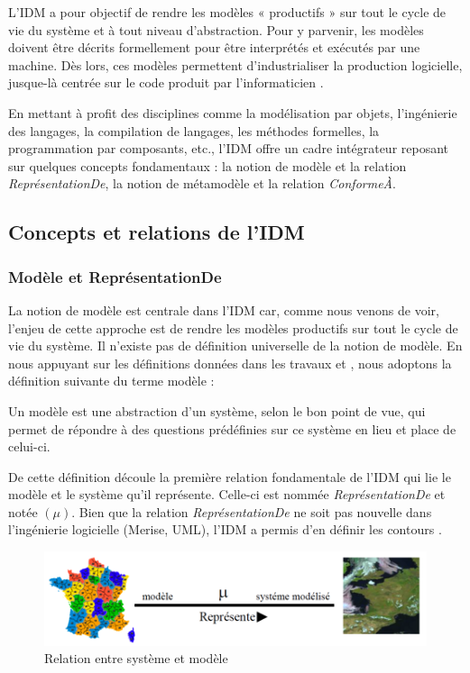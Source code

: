 L'IDM a pour objectif de rendre les modèles « productifs » sur tout le cycle de 
vie du système et à tout niveau d'abstraction. Pour y parvenir, les modèles 
doivent être décrits formellement pour être interprétés et exécutés par une 
machine. Dès lors, ces modèles permettent d'industrialiser la production 
logicielle, jusque-là centrée sur le code produit par l'informaticien 
\cite{bezivin2005unification}.

En mettant à profit des disciplines comme la modélisation par objets, 
l'ingénierie des langages, la compilation de langages, les méthodes formelles, 
la programmation par composants, etc., l'IDM offre un cadre intégrateur reposant 
sur quelques concepts fondamentaux : la notion de modèle et la relation 
\textit{ReprésentationDe}, la notion de métamodèle et la relation 
\textit{ConformeÀ}.

\subsection{Concepts et relations de l'IDM}
\subsubsection{Modèle et ReprésentationDe}
La notion de modèle est centrale dans l'IDM car, comme nous venons de voir, 
l'enjeu de cette approche est de rendre les modèles productifs sur tout le cycle 
de vie du système. Il n'existe pas de définition universelle de la notion de 
modèle. En nous appuyant sur les définitions données dans les travaux 
\cite{minsky1967computation} \cite{bezivin2001towards} et 
\cite{seidewitz2003models}, nous adoptons la définition suivante du terme modèle 
:

\begin{definition}
Un modèle est une abstraction d'un système, selon le bon point de vue, qui 
permet de répondre à des questions prédéfinies sur ce système en lieu et place 
de celui-ci.
\end{definition}

De cette définition découle la première relation fondamentale de l'IDM qui lie 
le modèle et le système qu'il représente. Celle-ci est nommée 
\textit{ReprésentationDe} et notée $(\mu)$. Bien que la relation 
\textit{ReprésentationDe} ne soit pas nouvelle dans l'ingénierie logicielle 
(Merise, UML), l'IDM a permis d'en définir les contours \cite{atkinson2003model} 
\cite{seidewitz2003models} \cite{bezivin2004search}.

\begin{figure}[!htbp]
 \begin{center}
  \includegraphics[width=1\textwidth]{images/Chapitre1/favresystememodele.png}
 \end{center}
 \caption{Relation entre système et modèle \protect\cite{favre2006ingenierie}}
 \label{fig:systemModele}
\end{figure}

